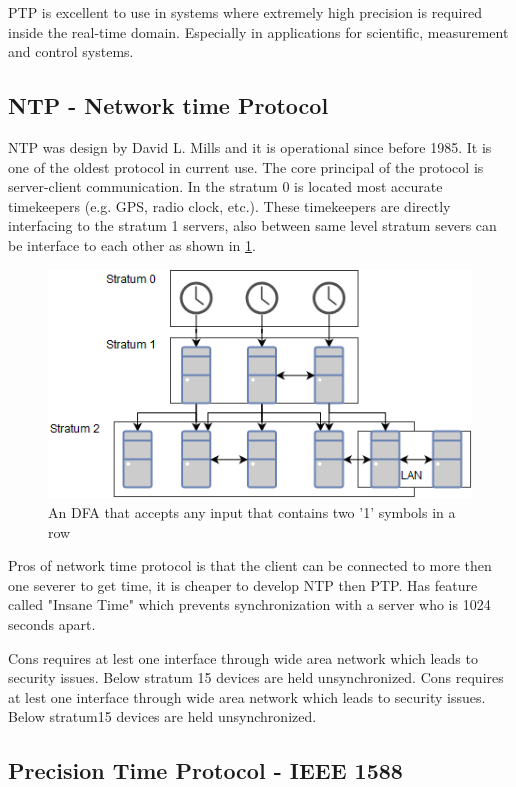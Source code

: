 \noindent PTP is excellent to use in systems where extremely high precision is required  inside the real-time domain. Especially in applications for scientific, measurement and control systems.

\subsection{NTP - Network time Protocol}

NTP was design by David L. Mills and it is operational since before 1985. It is one of the oldest protocol in
current use. The core principal of the protocol is server-client communication. In the stratum 0 is located
most accurate timekeepers (e.g. GPS, radio clock, etc.). These timekeepers are directly interfacing to the
stratum 1 servers, also between same level stratum severs can be interface to each other as shown in \ref{fig:NTP}.

\begin{figure}[H]\label{}
	\centering
	\includegraphics[scale=0.4]{synchronization/fig/NTP.png}
	\caption{An DFA that accepts any input that contains two '1' symbols in a row}
	\label{fig:NTP}
\end{figure}

\noindent Pros of network time protocol is that the client can be connected to more then one severer to get time, it is cheaper to develop NTP then PTP. Has feature called "Insane Time" which prevents synchronization with a server who is 1024 seconds apart.

\noindent Cons requires at lest one interface through wide area network which leads to security issues. Below stratum
15 devices are held unsynchronized.
Cons requires at lest one interface through wide area network which leads to security issues. Below stratum15 devices are held unsynchronized.

\subsection{Precision Time Protocol - IEEE 1588}

